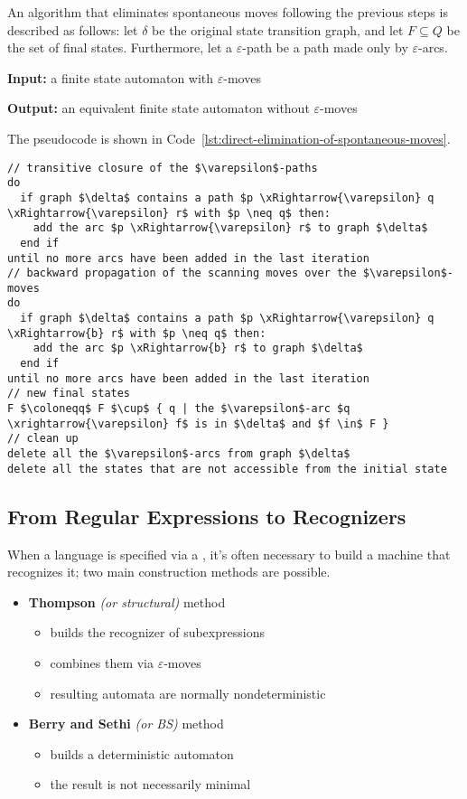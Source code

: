 \documentclass[english]{article}
\begin{document}
\bigskip
An algorithm that eliminates spontaneous moves following the previous steps is described as follows:
let \(\delta\) be the original state transition graph, and let \(F \subseteq Q\) be the set of final states.
Furthermore, let a \(\varepsilon\)-path be a path made only by \(\varepsilon\)-arcs.

\textbf{Input:}
a finite state automaton with \(\varepsilon\)-moves

\textbf{Output:}
an equivalent finite state automaton without \(\varepsilon\)-moves

\bigskip
The pseudocode is shown in Code~\ref{lst:direct-elimination-of-spontaneous-moves}.

\begin{lstlisting}[caption={Direct elimination of spontaneous moves}, label={lst:direct-elimination-of-spontaneous-moves}]
// transitive closure of the $\varepsilon$-paths
do
  if graph $\delta$ contains a path $p \xRightarrow{\varepsilon} q \xRightarrow{\varepsilon} r$ with $p \neq q$ then:
    add the arc $p \xRightarrow{\varepsilon} r$ to graph $\delta$
  end if
until no more arcs have been added in the last iteration
// backward propagation of the scanning moves over the $\varepsilon$-moves
do
  if graph $\delta$ contains a path $p \xRightarrow{\varepsilon} q \xRightarrow{b} r$ with $p \neq q$ then:
    add the arc $p \xRightarrow{b} r$ to graph $\delta$
  end if
until no more arcs have been added in the last iteration
// new final states
F $\coloneqq$ F $\cup$ { q | the $\varepsilon$-arc $q \xrightarrow{\varepsilon} f$ is in $\delta$ and $f \in$ F }
// clean up
delete all the $\varepsilon$-arcs from graph $\delta$
delete all the states that are not accessible from the initial state
\end{lstlisting}

\subsection{From Regular Expressions to Recognizers}

When a language is specified via a \re, it's often necessary to build a machine that recognizes it;
two main construction methods are possible.

\begin{itemize}
  \item \textbf{Thompson} \textit{(or structural)} method
        \begin{itemize}
          \item builds the recognizer of subexpressions
          \item combines them via \(\varepsilon\)-moves
          \item resulting automata are normally nondeterministic
        \end{itemize}
  \item \textbf{Berry and Sethi} \textit{(or BS)} method
        \begin{itemize}
          \item builds a deterministic automaton
          \item the result is not necessarily minimal
        \end{itemize}
\end{itemize}
\end{document}
